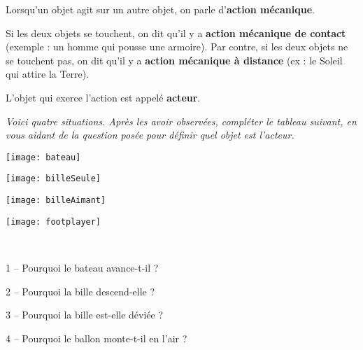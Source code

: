 \begin{activite}


Lorsqu'un objet agit sur un autre objet, on parle d'\textbf{action mécanique}.

Si les deux objets se touchent, on dit qu'il y a \textbf{action mécanique de contact} (exemple : un homme qui pousse une armoire). Par contre, si les deux objets ne se touchent pas, on dit qu'il y a \textbf{action mécanique à distance} (ex : le Soleil qui attire la Terre).   

L'objet qui exerce l'action est appelé \textbf{acteur}. 

\vspace{1em}

\textsl{Voici quatre situations. Après les avoir observées, compléter le tableau suivant, en vous aidant de la question posée pour définir quel objet est l'acteur.}

\vspace{1em}

\begin{minipage}[c]{.2\linewidth}
\centering%
\texttt{[image: bateau]} 
\end{minipage}\hfill%
\begin{minipage}[c]{.26\linewidth}
\centering%
\texttt{[image: billeSeule]}
\end{minipage}\hfill%
\begin{minipage}[c]{.26\linewidth}
\centering%
\texttt{[image: billeAimant]}
\end{minipage}\hfill%
\begin{minipage}[c]{.2\linewidth}
\centering%
\texttt{[image: footplayer]}
\end{minipage}\\[.5em]
%
%
\begin{minipage}[c]{.2\linewidth}
\centering
\footnotesize{1 -- Pourquoi le bateau avance-t-il ?}  
\end{minipage}\hfill%
\begin{minipage}[c]{.26\linewidth}
\centering
\footnotesize{2 -- Pourquoi la bille descend-elle ?}
\end{minipage}\hfill%
\begin{minipage}[c]{.26\linewidth}
\centering
\footnotesize{3 -- Pourquoi la bille est-elle déviée ?}
\end{minipage}\hfill%
\begin{minipage}[c]{.2\linewidth}
\centering
\footnotesize{4 -- Pourquoi le ballon monte-t-il en l'air ?}
\end{minipage}


\end{activite}
